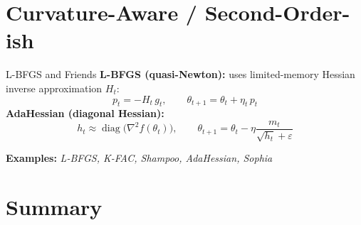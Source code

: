 \documentclass{beamer}
\begin{document}
\section{Curvature-Aware / Second-Order-ish}

\begin{frame}{L-BFGS and Friends}
\textbf{L-BFGS (quasi-Newton):} uses limited-memory Hessian inverse approximation $H_t$:
\[
  p_t = - H_t\, g_t,\qquad \theta_{t+1} = \theta_t + \eta_t\, p_t
\]
\textbf{AdaHessian (diagonal Hessian):}
\[
  h_t \approx \operatorname{diag}\!\big(\nabla^2 f(\theta_t)\big),\qquad
  \theta_{t+1} = \theta_t - \eta \frac{m_t}{\sqrt{h_t}+\varepsilon}
\]

\textbf{Examples:} \emph{L-BFGS, K-FAC, Shampoo, AdaHessian, Sophia}
\end{frame}

\section{Summary}
\end{document}
